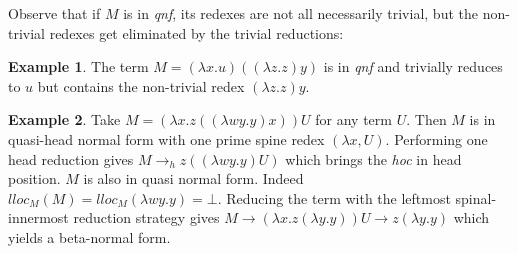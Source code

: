 \documentclass[xchauthor,chkrefs,GCNS,amsmath,amsthm,rotating,leaveRGB]{tcsg}
\theoremstyle{plain}
\theoremstyle{definition}
\newtheorem{example}{Example}[section]
\begin{document}
%
%
%
%
%

Observe that if $M$ is in \emph{qnf}, its redexes are not all necessarily
trivial, but the non-trivial redexes get eliminated by the trivial
reductions:

\begin{example}
The term $M = (\lambda x . u) ((\lambda z .z) y)$ is in \emph{qnf} and
trivially reduces to $u$ but contains the non-trivial redex $(\lambda z .z)
y$.
\end{example}

\begin{example}
Take $M = (\lambda x . z ((\lambda w y . y)x)) U$ for any term $U$. Then $M$
is in quasi-head normal form with one prime spine redex $(\lambda x,U)$.
Performing one head reduction gives $M \rightarrow _{h} z ((\lambda w y. y)
U)$ which brings the \emph{hoc} in head position. $M$ is also in quasi normal
form. Indeed $lloc_{M}(M) = lloc_{M} (\lambda w y . y) = \bot $. Reducing the
term with the leftmost spinal-innermost reduction strategy gives  $M
\rightarrow (\lambda x . z (\lambda y . y)) U \rightarrow  z (\lambda y . y)
$ which yields a beta-normal form.
\end{example}
\end{document}
